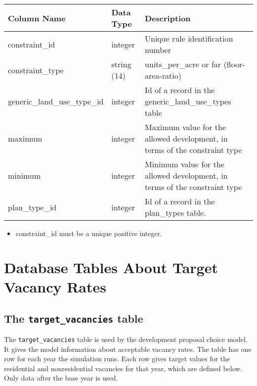 \begin{tabular}{llp{3.5in}}

\textbf{Column Name} & \textbf{Data Type} & \textbf{Description} \\

\hline constraint_id & integer & Unique rule identification number  \\

\hline constraint\_type & string (14) &  units\_per\_acre or far (floor-area-ratio) \\

\hline generic\_land\_use\_type\_id & integer & Id of a record in the generic\_land\_use\_types table \\

\hline maximum & integer & Maximum value for the allowed development, in terms of the constraint type \\

\hline minimum & integer & Minimum value for the allowed development, in terms of the constraint type \\

\hline plan_type_id & integer & Id of a record in the plan_types table. \\

\hline
\end{tabular}

\begin{itemize}
\tight
\item constraint_id must be a unique positive integer.

\end{itemize}

\section{Database Tables About Target Vacancy Rates}

\subsection{The {\tt target_vacancies} table}
\label{sec:table-target-vacancies-parcel}

The \verb|target_vacancies| table is used by the development proposal choice
model. It gives the model information about acceptable vacancy rates. The table
has one row for each year the simulation runs. Each row gives target values for
the residential and nonresidential vacancies for that year, which are defined
below.  Only data after the base year is used.

